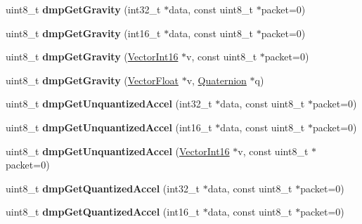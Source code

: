 \begin{DoxyCompactItemize}
\item 
\mbox{\label{class_m_p_u6050_a4411714ec5a1bb90e4c224d5e9d98b56}} 
uint8\+\_\+t {\bfseries dmp\+Get\+Gravity} (int32\+\_\+t $\ast$data, const uint8\+\_\+t $\ast$packet=0)
\item 
\mbox{\label{class_m_p_u6050_a557400f9ca5f07ff7d0d71f27f7a5169}} 
uint8\+\_\+t {\bfseries dmp\+Get\+Gravity} (int16\+\_\+t $\ast$data, const uint8\+\_\+t $\ast$packet=0)
\item 
\mbox{\label{class_m_p_u6050_adbeb3de073f6759bf8036a6f29697ea1}} 
uint8\+\_\+t {\bfseries dmp\+Get\+Gravity} (\mbox{\hyperlink{class_vector_int16}{Vector\+Int16}} $\ast$v, const uint8\+\_\+t $\ast$packet=0)
\item 
\mbox{\label{class_m_p_u6050_aa061914109ac5a74ad93c26c903abdd4}} 
uint8\+\_\+t {\bfseries dmp\+Get\+Gravity} (\mbox{\hyperlink{class_vector_float}{Vector\+Float}} $\ast$v, \mbox{\hyperlink{class_quaternion}{Quaternion}} $\ast$q)
\item 
\mbox{\label{class_m_p_u6050_a1232c8fed01938c6137df40fa2436d31}} 
uint8\+\_\+t {\bfseries dmp\+Get\+Unquantized\+Accel} (int32\+\_\+t $\ast$data, const uint8\+\_\+t $\ast$packet=0)
\item 
\mbox{\label{class_m_p_u6050_a9e427b2ba43ee6e7ba057e7f638836d1}} 
uint8\+\_\+t {\bfseries dmp\+Get\+Unquantized\+Accel} (int16\+\_\+t $\ast$data, const uint8\+\_\+t $\ast$packet=0)
\item 
\mbox{\label{class_m_p_u6050_a814788fea7688802a9f1d91573e94630}} 
uint8\+\_\+t {\bfseries dmp\+Get\+Unquantized\+Accel} (\mbox{\hyperlink{class_vector_int16}{Vector\+Int16}} $\ast$v, const uint8\+\_\+t $\ast$packet=0)
\item 
\mbox{\label{class_m_p_u6050_a34f581edc9b3e12a645940e3f700642e}} 
uint8\+\_\+t {\bfseries dmp\+Get\+Quantized\+Accel} (int32\+\_\+t $\ast$data, const uint8\+\_\+t $\ast$packet=0)
\item 
\mbox{\label{class_m_p_u6050_aa180351de905ea4b06502adefc4411d3}} 
uint8\+\_\+t {\bfseries dmp\+Get\+Quantized\+Accel} (int16\+\_\+t $\ast$data, const uint8\+\_\+t $\ast$packet=0)

\end{DoxyCompactItemize}
